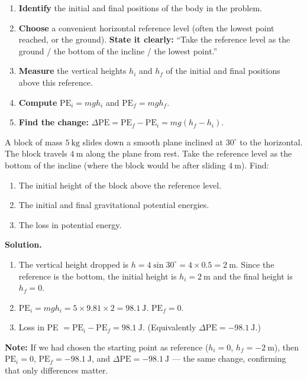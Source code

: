 \documentclass[11pt]{article}
\begin{document}
\begin{methode}
\begin{enumerate}
\item \textbf{Identify} the initial and final positions of the body in the problem.
\item \textbf{Choose} a convenient horizontal reference level (often the lowest point reached, or the ground). \textbf{State it clearly:} ``Take the reference level as the ground / the bottom of the incline / the lowest point.''
\item \textbf{Measure} the vertical heights $h_i$ and $h_f$ of the initial and final positions above this reference.
\item \textbf{Compute} $\mathrm{PE}_i = mgh_i$ and $\mathrm{PE}_f = mgh_f$.
\item \textbf{Find the change:} $\Delta\mathrm{PE} = \mathrm{PE}_f - \mathrm{PE}_i = mg(h_f - h_i)$.
\end{enumerate}
\end{methode}

\begin{exemplebox}
A block of mass $5\ \mathrm{kg}$ slides down a smooth plane inclined at $30^\circ$ to the horizontal. The block travels $4\ \mathrm{m}$ along the plane from rest. Take the reference level as the bottom of the incline (where the block would be after sliding $4\ \mathrm{m}$). Find:
\begin{enumerate}
\item The initial height of the block above the reference level.
\item The initial and final gravitational potential energies.
\item The loss in potential energy.
\end{enumerate}

\tcblower
\textbf{Solution.}
\begin{enumerate}
\item The vertical height dropped is $h = 4\sin 30^\circ = 4 \times 0.5 = 2\ \mathrm{m}$. Since the reference is the bottom, the initial height is $h_i = 2\ \mathrm{m}$ and the final height is $h_f = 0$.
\item $\mathrm{PE}_i = mgh_i = 5 \times 9.81 \times 2 = 98.1\ \mathrm{J}$. $\mathrm{PE}_f = 0$.
\item Loss in PE $= \mathrm{PE}_i - \mathrm{PE}_f = 98.1\ \mathrm{J}$. (Equivalently $\Delta\mathrm{PE} = -98.1\ \mathrm{J}$.)
\end{enumerate}
\textbf{Note:} If we had chosen the starting point as reference ($h_i = 0$, $h_f = -2\ \mathrm{m}$), then $\mathrm{PE}_i = 0$, $\mathrm{PE}_f = -98.1\ \mathrm{J}$, and $\Delta\mathrm{PE} = -98.1\ \mathrm{J}$ — the same change, confirming that only differences matter.
\end{exemplebox}
\end{document}
